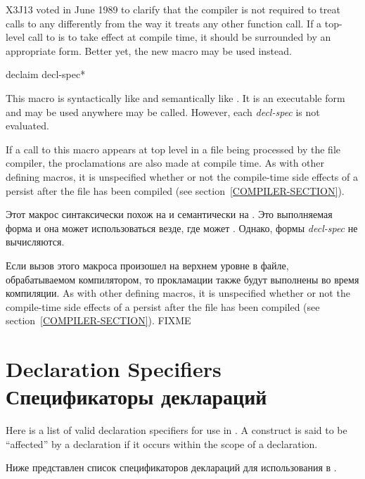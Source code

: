 \begin{newer}
X3J13 voted in June 1989 
to clarify that the compiler is not required to treat
calls to  any differently from the way it treats
any other function call.  If a top-level call to 
is to take effect at compile time, it should be surrounded
by an appropriate  form.  Better yet,
the new macro  may be used instead.

\begin{defmac}
declaim {decl-spec}*

This macro is syntactically like  and semantically
like .  It is an executable form and may be used
anywhere  may be called.  However, each \emph{decl-spec}
is not evaluated.

If a call to this macro appears at top level in a file
  being processed by the file compiler, the proclamations are also
  made at compile time.  As with other defining macros, it is 
  unspecified whether or not the compile-time side effects of a 
   persist after the file has been compiled
  (see section~\ref{COMPILER-SECTION}).

Этот макрос синтаксически похож на  и семантически на
. Это выполняемая форма и она может использоваться везде, где
может . Однако, формы \emph{decl-spec} не вычисляются.

Если вызов этого макроса произошел на верхнем уровне в файле, обрабатываемом
компилятором, то прокламации также будут выполнены во время компиляции. 
  As with other defining macros, it is 
  unspecified whether or not the compile-time side effects of a 
   persist after the file has been compiled
  (see section~\ref{COMPILER-SECTION}). FIXME
\end{defmac}
\end{newer}

\section{Declaration Specifiers Спецификаторы деклараций}
\label{DECLARATION-SPECIFIERS-SECTION}

Here is a list of valid declaration specifiers for use in
.  A construct is said to be ``affected'' by a declaration
if it occurs within the scope of a declaration.

Ниже представлен список спецификаторов деклараций для использования в
.

